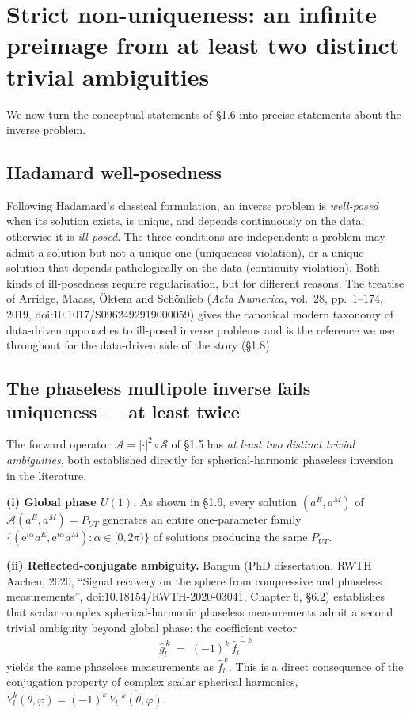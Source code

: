\documentclass[11pt,a4paper]{report}
\begin{document}
\section{Strict non-uniqueness: an infinite preimage from at least two distinct trivial ambiguities}

We now turn the conceptual statements of \S1.6 into precise statements about the
inverse problem.

\subsection*{Hadamard well-posedness}

Following Hadamard's classical formulation, an inverse problem is \emph{well-posed}
when its solution exists, is unique, and depends continuously on the data; otherwise
it is \emph{ill-posed}. The three conditions are independent: a problem may admit a
solution but not a unique one (uniqueness violation), or a unique solution that
depends pathologically on the data (continuity violation). Both kinds of
ill-posedness require regularisation, but for different reasons. The treatise of
Arridge, Maass, \"Oktem and Sch\"onlieb (\emph{Acta Numerica}, vol.~28, pp.~1--174,
2019, doi:10.1017/S0962492919000059) gives the canonical modern taxonomy of
data-driven approaches to ill-posed inverse problems and is the reference we use
throughout for the data-driven side of the story (\S1.8).

\subsection*{The phaseless multipole inverse fails uniqueness --- at least twice}

The forward operator $\mathcal{A} = |\cdot|^2 \circ \mathcal{S}$ of \S1.5 has
\emph{at least two distinct trivial ambiguities}, both established directly for
spherical-harmonic phaseless inversion in the literature.

\textbf{(i) Global phase $U(1)$.} As shown in \S1.6, every solution $(a^E, a^M)$ of
$\mathcal{A}(a^E, a^M) = P_{UT}$ generates an entire one-parameter family
$\{(\mathrm{e}^{i\alpha}a^E, \mathrm{e}^{i\alpha}a^M) : \alpha\in[0,2\pi)\}$ of
solutions producing the same $P_{UT}$.

\textbf{(ii) Reflected-conjugate ambiguity.} Bangun (PhD dissertation, RWTH Aachen,
2020, \enquote{Signal recovery on the sphere from compressive and phaseless
measurements}, doi:10.18154/RWTH-2020-03041, Chapter 6, \S6.2) establishes that
scalar complex spherical-harmonic phaseless measurements admit a second trivial
ambiguity beyond global phase: the coefficient vector
\[
\hat g_l^{\,k} \;=\; (-1)^k\,\overline{\hat f_l^{\,-k}}
\]
yields the same phaseless measurements as $\hat f_l^{\,k}$. This is a direct
consequence of the conjugation property of complex scalar spherical harmonics,
$Y_l^{k}(\theta,\varphi) = (-1)^k\,\overline{Y_l^{-k}(\theta,\varphi)}$.
\end{document}
